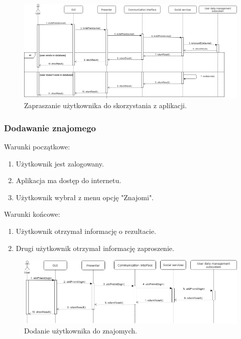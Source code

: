 \documentclass[10pt,twoside,a4paper]{report}
\begin{document}
\noindent\newline
\begin{figure}[h]
\centering
\includegraphics[width=\linewidth]{inviteFriend}
\caption{Zapraszanie użytkownika do skorzystania z aplikacji.}
\label{fig:inviteFriend}
\end{figure}
\FloatBarrier
\subsubsection{Dodawanie znajomego}

\noindent Warunki początkowe:
\begin{enumerate}
  \item Użytkownik jest zalogowany.
  \item Aplikacja ma dostęp do internetu.
  \item Użytkownik wybrał z menu opcję "Znajomi".
\end{enumerate}
\par
\noindent\newline
Warunki końcowe:
\begin{enumerate}
  \item Użytkownik otrzymał informację o rezultacie.
  \item Drugi użytkownik otrzymał informację zaproszenie.
\end{enumerate}

\noindent\newline
\begin{figure}[h]
\centering
\includegraphics[width=\linewidth]{addFriend}
\caption{Dodanie użytkownika do znajomych.}
\label{fig:addFriend}
\end{figure}
\FloatBarrier
\end{document}
